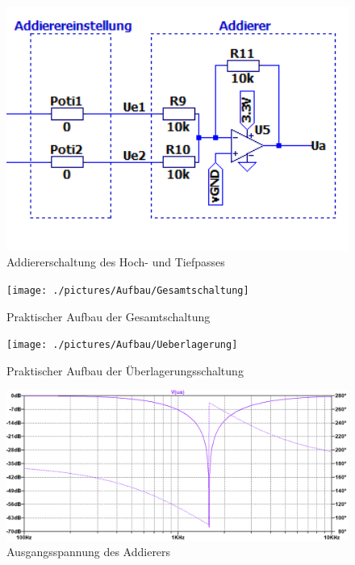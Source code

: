 \begin{figure}[htb]
    \includegraphics[width=14cm]{./pictures/Addierer}
    \caption{Addiererschaltung des Hoch- und Tiefpasses}
    \label{fig:Addierer}
\end{figure}

\begin{figure}[htb]
    \texttt{[image: ./pictures/Aufbau/Gesamtschaltung]}
    \caption{Praktischer Aufbau der Gesamtschaltung}
    \label{fig:GesamtschaltungPraktisch}
\end{figure}

\newpage
\begin{figure}[htb]
    \texttt{[image: ./pictures/Aufbau/Ueberlagerung]}
    \caption{Praktischer Aufbau der Überlagerungsschaltung}
    \label{fig:Überlagerung}
\end{figure}

\begin{figure}[htb]
    \includegraphics[width=16cm]{./pictures/Gesamtschaltung}
    \caption{Ausgangsspannung des Addierers}
    \label{fig:AddiererAusgangsspannung}
\end{figure}

